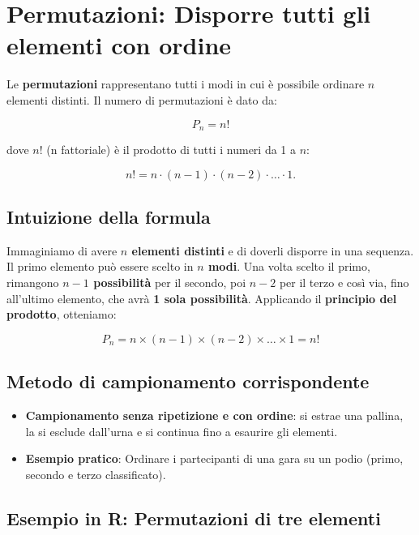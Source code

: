 \documentclass[
  italian,
  letterpaper,
  a4paper,
  11pt,
  open=any]{scrbook}
\providecommand{\tightlist}{%
  \setlength{\itemsep}{0pt}\setlength{\parskip}{0pt}}
\theoremstyle{plain}
\theoremstyle{definition}
\theoremstyle{definition}
\theoremstyle{remark}
\begin{document}
\section{Permutazioni: Disporre tutti gli elementi con
ordine}\label{permutazioni-disporre-tutti-gli-elementi-con-ordine}

Le \textbf{permutazioni} rappresentano tutti i modi in cui è possibile
ordinare \(n\) elementi distinti. Il numero di permutazioni è dato da:

\[
P_n = n!
\]

dove \(n!\) (n fattoriale) è il prodotto di tutti i numeri da 1 a \(n\):

\[
n! = n \cdot (n-1) \cdot (n-2) \cdot \dots \cdot 1.
\]

\subsection{Intuizione della formula}\label{intuizione-della-formula}

Immaginiamo di avere \textbf{\(n\) elementi distinti} e di doverli
disporre in una sequenza. Il primo elemento può essere scelto in
\textbf{\(n\) modi}. Una volta scelto il primo, rimangono
\textbf{\(n-1\) possibilità} per il secondo, poi \textbf{\(n-2\)} per il
terzo e così via, fino all'ultimo elemento, che avrà \textbf{1 sola
possibilità}. Applicando il \textbf{principio del prodotto}, otteniamo:

\[
P_n = n \times (n-1) \times (n-2) \times \dots \times 1 = n!
\]

\subsection{Metodo di campionamento
corrispondente}\label{metodo-di-campionamento-corrispondente}

\begin{itemize}
\tightlist
\item
  \textbf{Campionamento senza ripetizione e con ordine}: si estrae una
  pallina, la si esclude dall'urna e si continua fino a esaurire gli
  elementi.\\
\item
  \textbf{Esempio pratico}: Ordinare i partecipanti di una gara su un
  podio (primo, secondo e terzo classificato).
\end{itemize}

\subsection{Esempio in R: Permutazioni di tre
elementi}\label{esempio-in-r-permutazioni-di-tre-elementi}
\end{document}
